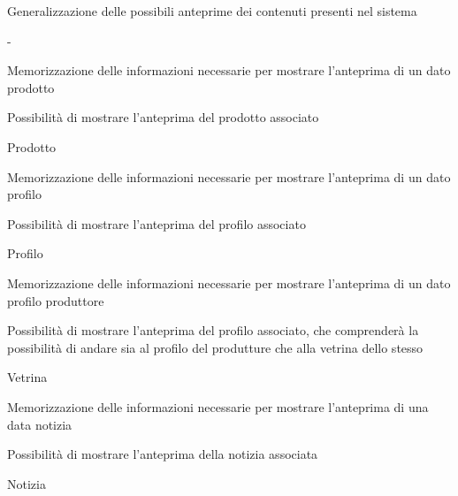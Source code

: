 
{\begin{itemWork}
	\item Generalizzazione delle possibili anteprime dei contenuti presenti nel sistema
\end{itemWork}}
{-}


{\begin{itemWork}
	\item Memorizzazione delle informazioni necessarie per mostrare l'anteprima di un dato prodotto
	\item Possibilità di mostrare l'anteprima del prodotto associato
\end{itemWork}}
{Prodotto}


{\begin{itemWork}
	\item Memorizzazione delle informazioni necessarie per mostrare l'anteprima di un dato profilo
	\item Possibilità di mostrare l'anteprima del profilo associato
\end{itemWork}}
{Profilo}


{\begin{itemWork}
	\item Memorizzazione delle informazioni necessarie per mostrare l'anteprima di un dato profilo produttore
	\item Possibilità di mostrare l'anteprima del profilo associato, che comprenderà la possibilità di andare sia al profilo del produtture che alla vetrina dello stesso
\end{itemWork}}
{Vetrina}


{\begin{itemWork}
	\item Memorizzazione delle informazioni necessarie per mostrare l'anteprima di una data notizia
	\item Possibilità di mostrare l'anteprima della notizia associata
\end{itemWork}}
{Notizia}


